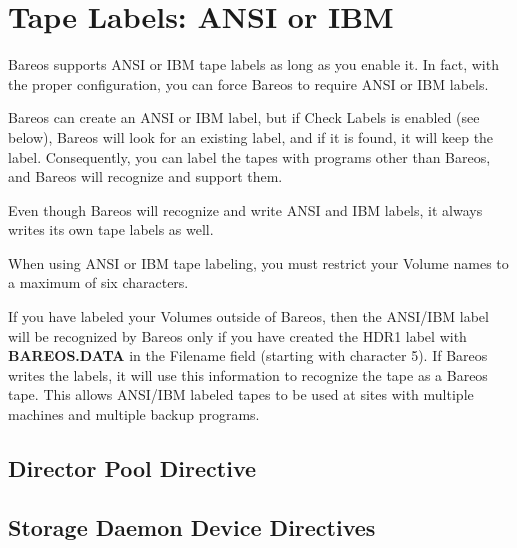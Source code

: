 
\section{Tape Labels: ANSI or IBM}
\label{AnsiLabelsChapter}

Bareos supports ANSI or IBM tape labels as long as you
enable it.  In fact, with the proper configuration, you can
force Bareos to require ANSI or IBM labels.

Bareos can create an ANSI or IBM label, but if Check Labels is
enabled (see below), Bareos will look for an existing label, and
if it is found, it will keep the label. Consequently, you
can label the tapes with programs other than Bareos, and Bareos
will recognize and support them.

Even though Bareos will recognize and write ANSI and IBM labels,
it always writes its own tape labels as well.

When using ANSI or IBM tape labeling, you must restrict your Volume
names to a maximum of six characters.

If you have labeled your Volumes outside of Bareos, then the
ANSI/IBM label will be recognized by Bareos only if you have created
the HDR1 label with {\bf BAREOS.DATA} in the Filename field (starting
with character 5).  If Bareos writes the labels, it will use
this information to recognize the tape as a Bareos tape.  This allows
ANSI/IBM labeled tapes to be used at sites with multiple machines
and multiple backup programs.


\subsection{Director Pool Directive}

\begin{description}
\end{description}

\subsection{Storage Daemon Device Directives}


